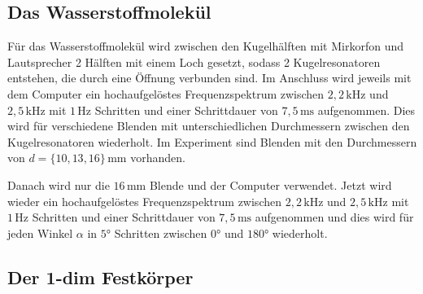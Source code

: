 \subsection{Das Wasserstoffmolekül}
\label{sec:d_H2}

Für das Wasserstoffmolekül wird zwischen den Kugelhälften mit Mirkorfon und Lautsprecher 2 Hälften mit einem Loch gesetzt, sodass 2 Kugelresonatoren entstehen, die durch eine Öffnung verbunden sind. Im Anschluss wird jeweils mit dem Computer ein hochaufgelöstes Frequenzspektrum zwischen $2, \! 2 \, \mathrm{kHz}$ und $2, \! 5 \, \mathrm{kHz}$ mit $1 \, \mathrm{Hz}$ Schritten und einer Schrittdauer von $7, \! 5 \, \mathrm{ms}$ aufgenommen. Dies wird für verschiedene Blenden mit unterschiedlichen Durchmessern zwischen den Kugelresonatoren wiederholt. Im Experiment sind Blenden mit den Durchmessern von $d = \{ 10, 13, 16 \} \, \mathrm{mm}$ vorhanden. \newline

Danach wird nur die $16 \, \mathrm{mm}$ Blende und der Computer verwendet. Jetzt wird wieder ein hochaufgelöstes Frequenzspektrum zwischen $2, \! 2 \, \mathrm{kHz}$ und $2, \! 5 \, \mathrm{kHz}$ mit $1 \, \mathrm{Hz}$ Schritten und einer Schrittdauer von $7, \! 5 \, \mathrm{ms}$ aufgenommen und dies wird für jeden Winkel $\alpha$ in $5°$ Schritten zwischen $0°$ und $180°$ wiederholt.

\subsection{Der 1-dim Festkörper}
\label{sec:d_fk}

